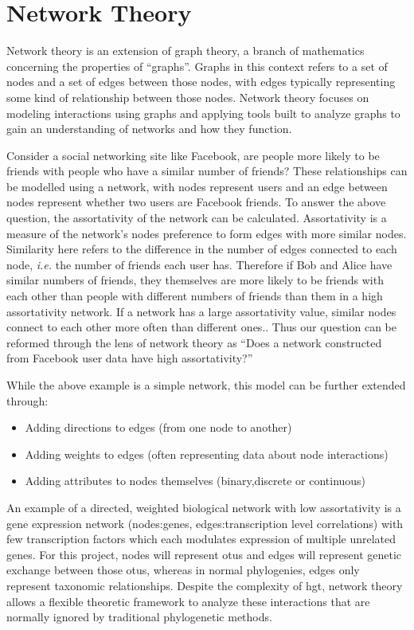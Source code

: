 \documentclass[12pt,letter]{article}
\begin{document}
\section*{Network Theory}
Network theory is an extension of graph theory, a branch of mathematics concerning the properties of ``graphs''.
Graphs in this context refers to a set of nodes and a set of edges between those nodes, with edges typically representing some kind of relationship between those nodes\citep{netgen}.
Network theory focuses on modeling interactions using graphs and applying tools built to analyze graphs to gain an understanding of networks and how they function.\par
Consider a social networking site like Facebook, are people more likely to be friends with people who have a similar number of friends?
These relationships can be modelled using a network, with nodes represent users and an edge between nodes represent whether two users are Facebook friends.
To answer the above question, the assortativity of the network can be calculated.
Assortativity is a measure of the network's nodes preference to form edges with more similar nodes\citep{netgen}.
Similarity here refers to the difference in the number of edges connected to each node, \textit{i.e.} the number of friends each user has.
Therefore if Bob and Alice have similar numbers of friends, they themselves are more likely to be friends with each other than people with different numbers of friends than them in a high assortativity network.
If a network has a large assortativity value, similar nodes connect to each other more often than different ones.\citep{netgen}.
Thus our question can be reformed through the lens of network theory as ``Does a network constructed from Facebook user data have high assortativity?''
\begin{center}
\end{center}
While the above example is a simple network, this model can be further extended through:
\begin{itemize}
    \item Adding directions to edges (from one node to another)
    \item Adding weights to edges (often representing data about node interactions)
    \item Adding attributes to nodes themselves (binary,discrete or continuous)
\end{itemize}
An example of a directed, weighted biological network with low assortativity is a gene expression network (nodes:genes, edges:transcription level correlations) with few transcription factors which each modulates expression of multiple unrelated genes.
For this project, nodes will represent \ac{otu}s and edges will represent genetic exchange between those \ac{otu}s, whereas in normal phylogenies, edges only represent taxonomic relationships.
Despite the complexity of \ac{hgt}, network theory allows a flexible theoretic framework to analyze these interactions that are normally ignored by traditional phylogenetic methods.
\end{document}

